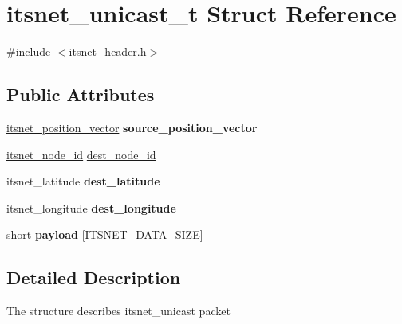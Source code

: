 \hypertarget{structitsnet__unicast__t}{\section{itsnet\-\_\-unicast\-\_\-t \-Struct \-Reference}
\label{structitsnet__unicast__t}
}


{\ttfamily \#include $<$itsnet\-\_\-header.\-h$>$}

\subsection*{\-Public \-Attributes}
\begin{DoxyCompactItemize}
\item 
\hypertarget{structitsnet__unicast__t_aa91a0cccf71be8683474add78c53ad19}{\hyperlink{structitsnet__position__vector}{itsnet\-\_\-position\-\_\-vector} {\bfseries source\-\_\-position\-\_\-vector}}\label{structitsnet__unicast__t_aa91a0cccf71be8683474add78c53ad19}

\item 
\hyperlink{structitsnet__node__id}{itsnet\-\_\-node\-\_\-id} \hyperlink{structitsnet__unicast__t_ab6ac57187ac2010c5b8f86f645f3b8e1}{dest\-\_\-node\-\_\-id}
\item 
\hypertarget{structitsnet__unicast__t_a534f88a4008719bb3e169f8010fedecf}{itsnet\-\_\-latitude {\bfseries dest\-\_\-latitude}}\label{structitsnet__unicast__t_a534f88a4008719bb3e169f8010fedecf}

\item 
\hypertarget{structitsnet__unicast__t_adbc9e691bc3b675141c8982474250f46}{itsnet\-\_\-longitude {\bfseries dest\-\_\-longitude}}\label{structitsnet__unicast__t_adbc9e691bc3b675141c8982474250f46}

\item 
\hypertarget{structitsnet__unicast__t_afba75746ef076e43238e541881752921}{short {\bfseries payload} \mbox{[}\-I\-T\-S\-N\-E\-T\-\_\-\-D\-A\-T\-A\-\_\-\-S\-I\-Z\-E\mbox{]}}\label{structitsnet__unicast__t_afba75746ef076e43238e541881752921}

\end{DoxyCompactItemize}


\subsection{\-Detailed \-Description}
\-The structure describes itsnet\-\_\-unicast packet 

